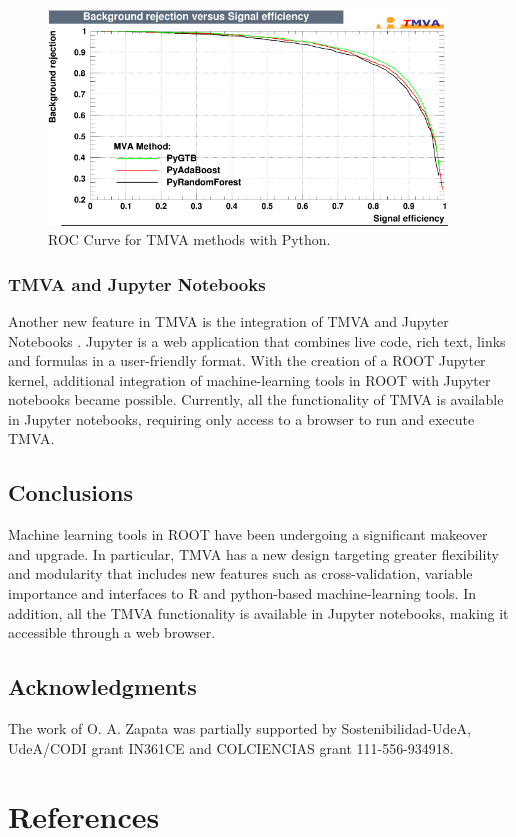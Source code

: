 \documentclass[a4paper]{jpconf}
\begin{document}
\begin{figure}[h]
\centering
\includegraphics[width=25pc]{img/pymvaroc.png}\caption{\label{pymvaroc} ROC Curve for TMVA methods with Python.}
\end{figure}


\subsubsection{TMVA and Jupyter Notebooks}
Another new feature in TMVA is the integration of TMVA and Jupyter Notebooks \cite{PER-GRA:2007}. Jupyter is a web application that combines live code, rich text, links and formulas in a user-friendly format. With the creation of a ROOT Jupyter kernel, additional integration of machine-learning tools in ROOT with Jupyter notebooks became possible. Currently, all the functionality of TMVA is available in Jupyter notebooks, requiring only access to a browser to run and execute TMVA.

\subsection{Conclusions}
Machine learning tools in ROOT have been undergoing a significant makeover and upgrade. In particular, TMVA has a new design targeting greater flexibility and modularity that includes new features such as cross-validation, variable importance and interfaces to R and python-based machine-learning tools. In addition, all the TMVA functionality is available in Jupyter notebooks, making it accessible through a web browser.




\subsection{Acknowledgments}
The work of O. A. Zapata was partially supported by Sostenibilidad-UdeA, UdeA/CODI grant IN361CE and COLCIENCIAS grant 111-556-934918.\newline





\section*{References}

\end{document}
